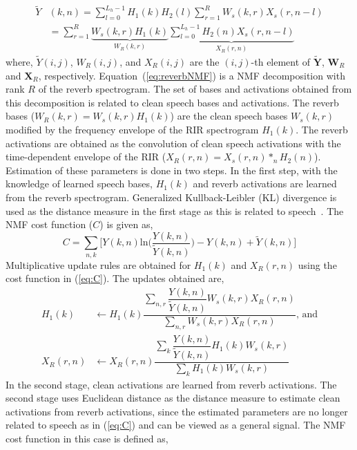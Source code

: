 \begin{align}
\tilde{Y}&(k,n) = \sum_{l=0}^{L_h-1} H_1(k)H_2(l) \sum_{r=1}^R W_{s}(k,r)X_{s}(r,n-l)\nonumber\\
& = \sum_{r=1}^R \underbrace{W_s(k,r)H_1(k)}_{W_R(k,r)} \underbrace{\sum_{l=0}^{L_h-1}H_2(n)X_s(r,n-l)}_{X_R(r,n)}
\label{eq:reverbNMF}
\end{align}
where, $\tilde{Y}(i,j)$, $W_R(i,j)$, and $X_R(i,j)$ are the $(i,j)$-th element of $\tilde{\mathbf{Y}}$, $\mathbf{W}_R$ and $\mathbf{X}_R$, respectively. Equation~(\ref{eq:reverbNMF}) is a NMF decomposition with rank $R$ of the reverb spectrogram. The set of bases and activations obtained from this decomposition is related to clean speech bases and activations. The reverb bases ($W_R(k,r)=W_s(k,r)H_1(k)$) are the clean speech bases $W_s(k,r)$ modified by the frequency envelope of the RIR spectrogram $H_1(k)$.
The reverb activations are obtained as the convolution of clean speech activations with the time-dependent envelope of the RIR ($X_R(r,n)=X_s(r,n)*_nH_2(n)$). Estimation of these parameters is done in two steps. In the first step, with the knowledge of learned speech bases, $H_1(k)$ and reverb activations are learned from the reverb spectrogram. Generalized Kullback-Leibler (KL) divergence is used as the distance measure in the first stage as this is related to speech~\cite{mohammadiha2016speech}. The NMF cost function ($C$) is given as, 
\begin{equation}
C = \sum_{n,k} \bigg[Y(k,n)\text{ln}\bigg(\dfrac{Y(k,n)}{\tilde{Y}(k,n)}\bigg) - Y(k,n) + \tilde{Y}(k,n)\bigg]
\label{eq:C}
\end{equation}
Multiplicative update rules are obtained for $H_1(k)$ and $X_R(r,n)$ using the cost function in (\ref{eq:C}). The updates obtained are,
\begin{align}
H_1(k)&\leftarrow H_1(k) \dfrac{\sum_{n,r} \dfrac{Y(k,n)}{\tilde{Y}(k,n)} W_s(k,r)X_R(r,n)}{\sum_{n,r} W_s(k,r)X_R(r,n)}\text{, and}\nonumber\\
X_R(r,n)&\leftarrow X_R(r,n) \dfrac{\sum_k \dfrac{Y(k,n)}{\tilde{Y}(k,n)}H_1(k)W_s(k,r)}{\sum_k H_1(k)W_s(k,r)}
\label{eq:updateProp}
\end{align} 
In the second stage, clean activations are learned from reverb activations. The second stage uses Euclidean distance as the distance measure to estimate clean activations from reverb activations, since the estimated parameters are no longer related to speech as in (\ref{eq:C}) and can be viewed as a general signal. The NMF cost function in this case is defined as,
